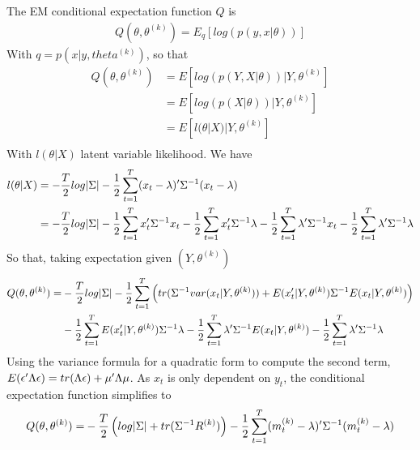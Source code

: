 \documentclass[twoside]{article}
\begin{document}
The EM conditional expectation function $Q$ is
\begin{align*}
Q(\theta, \theta^{(k)}) = E_q \left[ log\left(p(y, x | \theta) \right) \right]
\end{align*}
With $q = p(x | y, theta^{(k)})$, so that
\begin{align*}
Q(\theta, \theta^{(k)}) & = E \left[ log\left(p(Y, X | \theta)\right) | Y, \theta^{(k)} \right]\\
& = E \left[ log\left(p(X | \theta)\right) | Y, \theta^{(k)} \right]\\
& = E \left[ l(\theta|X) | Y, \theta^{(k)} \right]\\
\end{align*}
With $l(\theta|X)$ latent variable likelihood. We have
\begin{align*}
l(\theta | X) & = - \frac{T}{2} \* log|\Sigma| - \frac{1}{2	} \* \sum_{t=1}^{T} (x_t - \lambda)' \* \Sigma^{-1} \* (x_t - \lambda)\\
& = - \frac{T}{2} \* log|\Sigma| - \frac{1}{2} \* \sum_{t=1}^{T} x_t' \* \Sigma^{-1} \* x_t - \frac{1}{2} \* \sum_{t=1}^{T} x_t' \* \Sigma^{-1} \* \lambda - \frac{1}{2} \* \sum_{t=1}^{T}  \lambda' \* \Sigma^{-1} \* x_t - \frac{1}{2	} \* \sum_{t=1}^{T} \lambda' \* \Sigma^{-1} \* \lambda\\
\end{align*}
So that, taking expectation given $(Y, \theta^{(k)})$
\begin{align*}
Q(\theta, \theta^{(k)}) = & - \frac{T}{2} \* log|\Sigma| - \frac{1}{2} \* \sum_{t=1}^{T} \left( tr(\Sigma^{-1} \* var(x_t| Y, \theta^{(k)})) + E(x_t' | Y, \theta^{(k)}) \* \Sigma^{-1} \* E(x_t | Y, \theta^{(k)}) \right) \\
& - \frac{1}{2} \* \sum_{t=1}^{T} E(x_t' | Y, \theta^{(k)}) \* \Sigma^{-1} \* \lambda - \frac{1}{2} \* \sum_{t=1}^{T}  \lambda' \* \Sigma^{-1} \* E(x_t | Y, \theta^{(k)}) - \frac{1}{2	} \* \sum_{t=1}^{T} \lambda' \* \Sigma^{-1} \* \lambda\\
\end{align*}
Using the variance formula for a quadratic form to compute the second term, $E(\epsilon' \Lambda \epsilon) = tr(\Lambda \epsilon) + \mu' \* \Lambda \mu$. As $x_t$ is only dependent on $y_t$, the conditional expectation function simplifies to
\begin{align*}
Q(\theta, \theta^{(k)}) = & - \frac{T}{2} \* \left(log|\Sigma| + tr(\Sigma^{-1} \* R^{(k)}) \right) - \frac{1}{2} \* \sum_{t=1}^{T} (m_t^{(k)} - \lambda)' \* \Sigma^{-1} \* (m_t^{(k)} - \lambda) \\
\end{align*}
\end{document}
